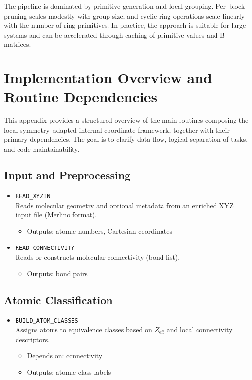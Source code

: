 \documentclass[11pt,a4paper]{article}
\begin{document}
The pipeline is dominated by primitive generation and local grouping.
Per--block pruning scales modestly with group size, and cyclic ring operations
scale linearly with the number of ring primitives. In practice, the approach
is suitable for large systems and can be accelerated through caching of
primitive values and B--matrices.

\appendix
\section{Implementation Overview and Routine Dependencies}

This appendix provides a structured overview of the main routines composing
the local symmetry--adapted internal coordinate framework, together with their
primary dependencies.
The goal is to clarify data flow, logical separation of tasks, and code
maintainability.

\subsection{Input and Preprocessing}

\begin{itemize}
  \item \texttt{READ\_XYZIN} \\
  Reads molecular geometry and optional metadata from an enriched XYZ input
  file (Merlino format).
  \begin{itemize}
    \item Outputs: atomic numbers, Cartesian coordinates
  \end{itemize}

  \item \texttt{READ\_CONNECTIVITY} \\
  Reads or constructs molecular connectivity (bond list).
  \begin{itemize}
    \item Outputs: bond pairs
  \end{itemize}
\end{itemize}

\subsection{Atomic Classification}

\begin{itemize}
  \item \texttt{BUILD\_ATOM\_CLASSES} \\
  Assigns atoms to equivalence classes based on $Z_{\mathrm{eff}}$ and local
  connectivity descriptors.
  \begin{itemize}
    \item Depends on: connectivity
    \item Outputs: atomic class labels
  \end{itemize}
\end{itemize}
\end{document}
